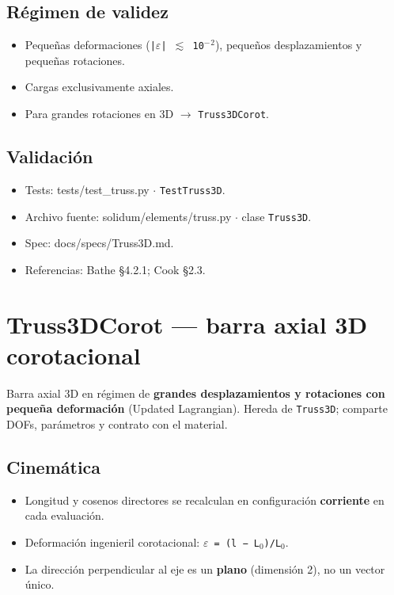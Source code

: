 \documentclass[11pt,letterpaper,oneside]{report}
\begin{document}
\subsection{Régimen de validez}
\begin{itemize}
  \item Pequeñas deformaciones (\texttt{|\ensuremath{\varepsilon}| \ensuremath{\lesssim} 10\ensuremath{^{-}}\ensuremath{^{2}}}), pequeños desplazamientos y pequeñas rotaciones.
  \item Cargas exclusivamente axiales.
  \item Para grandes rotaciones en 3D \ensuremath{\to} \texttt{Truss3DCorot}.
\end{itemize}

\subsection{Validación}
\begin{itemize}
  \item Tests: tests/test\_truss.py \ensuremath{\cdot} \texttt{TestTruss3D}.
  \item Archivo fuente: solidum/elements/truss.py \ensuremath{\cdot} clase \texttt{Truss3D}.
  \item Spec: docs/specs/Truss3D.md.
  \item Referencias: Bathe §4.2.1; Cook §2.3.
\end{itemize}


\section{Truss3DCorot --- barra axial 3D corotacional}

Barra axial 3D en régimen de \textbf{grandes desplazamientos y rotaciones con pequeña deformación} (Updated Lagrangian). Hereda de \texttt{Truss3D}; comparte DOFs, parámetros y contrato con el material.

\subsection{Cinemática}
\begin{itemize}
  \item Longitud y cosenos directores se recalculan en configuración \textbf{corriente} en cada evaluación.
  \item Deformación ingenieril corotacional: \texttt{\ensuremath{\varepsilon} = (l − L\ensuremath{_{0}})/L\ensuremath{_{0}}}.
  \item La dirección perpendicular al eje es un \textbf{plano} (dimensión 2), no un vector único.
\end{itemize}
\end{document}

